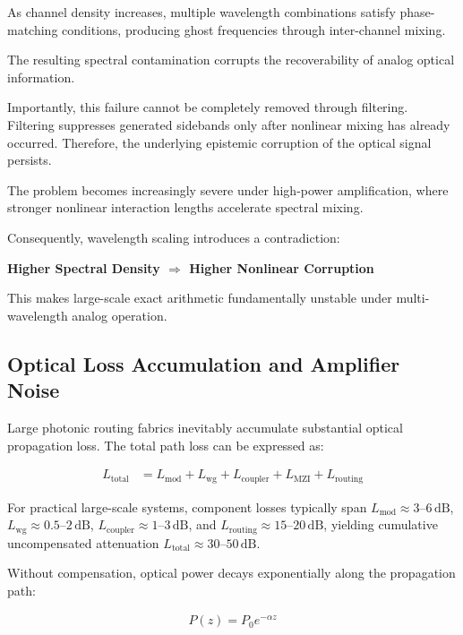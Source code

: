 \documentclass[journal]{IEEEtran}
\begin{document}
As channel density increases, multiple wavelength combinations satisfy phase-matching conditions, producing ghost frequencies through inter-channel mixing.

The resulting spectral contamination corrupts the recoverability of analog optical information.

Importantly, this failure cannot be completely removed through filtering. Filtering suppresses generated sidebands only after nonlinear mixing has already occurred. Therefore, the underlying epistemic corruption of the optical signal persists.

The problem becomes increasingly severe under high-power amplification, where stronger nonlinear interaction lengths accelerate spectral mixing.

Consequently, wavelength scaling introduces a contradiction:

\textbf{Higher Spectral Density $\Longrightarrow$ Higher Nonlinear Corruption}

This makes large-scale exact arithmetic fundamentally unstable under multi-wavelength analog operation.

\subsection{\textbf{Optical Loss Accumulation and Amplifier Noise}}
\label{sec:loss_accumulation}

Large photonic routing fabrics inevitably accumulate substantial optical propagation loss. The total path loss can be expressed as:

\begin{align}
L_{\mathrm{total}}
&=
L_{\mathrm{mod}}
+
L_{\mathrm{wg}}
+
L_{\mathrm{coupler}}
+
L_{\mathrm{MZI}}
+
L_{\mathrm{routing}}
\label{eq:total_loss}
\end{align}

For practical large-scale systems, component losses typically span $L_{\mathrm{mod}} \approx 3\text{--}6\,\mathrm{dB}$, $L_{\mathrm{wg}} \approx 0.5\text{--}2\,\mathrm{dB}$, $L_{\mathrm{coupler}} \approx 1\text{--}3\,\mathrm{dB}$, and $L_{\mathrm{routing}} \approx 15\text{--}20\,\mathrm{dB}$, yielding cumulative uncompensated attenuation $L_{\mathrm{total}} \approx 30\text{--}50\,\mathrm{dB}$.


Without compensation, optical power decays exponentially along the propagation path:

\begin{align}
P(z) = P_0 e^{-\alpha z}
\label{eq:loss_exponential}
\end{align}
\end{document}
